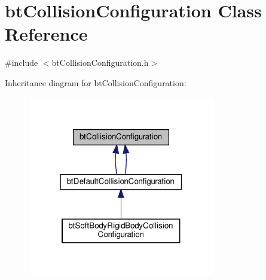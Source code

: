 \hypertarget{classbtCollisionConfiguration}{}\section{bt\+Collision\+Configuration Class Reference}
\label{classbtCollisionConfiguration}


{\ttfamily \#include $<$bt\+Collision\+Configuration.\+h$>$}



Inheritance diagram for bt\+Collision\+Configuration\+:
\nopagebreak
\begin{figure}[H]
\begin{center}
\leavevmode
\includegraphics[width=232pt]{classbtCollisionConfiguration__inherit__graph}
\end{center}
\end{figure}
